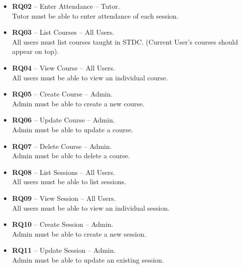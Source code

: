\begin{justify}
\begin{itemize}
\begin{itemize}
\begin{itemize}
                        \item \textbf{\textcolor{vin}{RQ02}} -- Enter Attendance -- Tutor.\\Tutor must be able to enter attendance of each session.

                        \item \textbf{\textcolor{vin}{RQ03}} -- List Courses -- All Users.\\All users must list courses taught in STDC. (Current User’s courses should appear on top).
                        
                        \item \textbf{\textcolor{vin}{RQ04}} -- View Course -- All Users.\\All users must be able to view an individual course.

                        \item \textbf{\textcolor{vin}{RQ05}} -- Create Course -- Admin.\\Admin must be able to create a new course.

                        \item \textbf{\textcolor{vin}{RQ06}} -- Update Course -- Admin.\\Admin must be able to update a course.

                        \item \textbf{\textcolor{vin}{RQ07}} -- Delete Course -- Admin.\\Admin must be able to delete a course.

                        \item \textbf{\textcolor{vin}{RQ08}} -- List Sessions -- All Users.\\All users must be able to list sessions.
                        
                        \item \textbf{\textcolor{vin}{RQ09}} -- View Session -- All Users.\\All users must be able to view an individual session.

                        \item \textbf{\textcolor{vin}{RQ10}} -- Create Session -- Admin.\\Admin must be able to create a new session.

                        \item \textbf{\textcolor{vin}{RQ11}} -- Update Session -- Admin.\\Admin must be able to update an existing session.


\end{itemize}
\end{itemize}
\end{itemize}
\end{justify}
